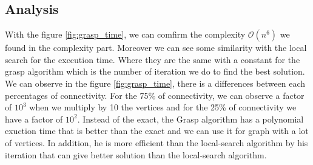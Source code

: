 
\subsection{Analysis}

With the figure \ref{fig:grasp_time}, we can comfirm the complexity $\mathcal{O}(n^6)$ we found in the complexity part.
Moreover we can see some similarity with the local search for the execution time. Where they are the same with a constant for the grasp algorithm 
which is the number of iteration we do to find the best solution.
\bigskip
We can observe in the figure \ref{fig:grasp_time}, there is a differences between each percentages of connectivity.
For the 75\% of connectivity, we can observe a factor of $10^3$ when we multiply by 10 the vertices and for the 25\% of connectivity
we have a factor of $10^2$.
\bigskip
Instead of the exact, the Grasp algorithm has a polynomial exuction time that is better than the exact and we can use it for graph with a lot of vertices.
In addition, he is more efficient than the local-search algorithm by his iteration that can give better solution than the local-search algorithm.